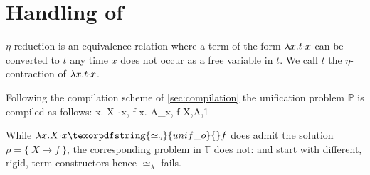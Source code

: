 \documentclass[sigconf,natbib=false,review]{acmart}
\newcommand{\appsep}{\ensuremath{\textcolor{lightgray}{\cdot}}}
\newcommand{\UnifRel}{\ensuremath{\simeq}}
\newcommand{\Uo}{\texorpdfstring{\ensuremath{\UnifRel_o}\xspace}{unif\_o}}
\newcommand{\Ue}{\ensuremath{\UnifRel_\lambda}\xspace}
\newcommand{\foUnifPb}{\ensuremath{\mathbb{P}}\xspace}
\newcommand{\hoUnifPb}{\ensuremath{\mathbb{T}}\xspace}
\begin{document}







\section{Handling of \maybeeta}\label{sec:eta}
$\eta$-reduction is an equivalence relation where a term of the form
$\lambda x.t \appsep x$ can be converted to $t$ any time $x$ does not occur as a
free variable in $t$. We call $t$ the $\eta$-contraction of
$\lambda x. t \appsep x$.

Following the compilation scheme of \cref{sec:compilation} the
unification problem \foUnifPb is compiled as follows:
%
\printAlll
  {{{\lambda x. X \appsep x, f}}}
  {{{\lambda x. A_x, f}}}
  {{{X,A,1}}}
  {{}}

\noindent
While $\lambda x.X \appsep x \Uo{} f$ does admit the solution
$\rho = \{~ X \mapsto f ~\}$, the corresponding problem in
\hoUnifPb does not:
 and
 start with different, rigid, term constructors hence
\Ue{} fails.
\end{document}
